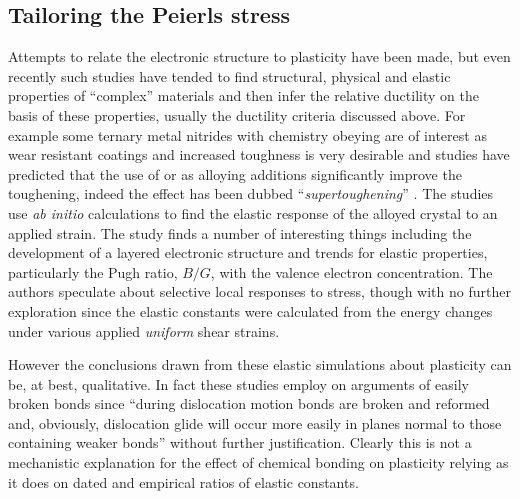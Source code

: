 



\FloatBarrier
\subsection{Tailoring the Peierls stress}
\label{subsec:tailor_peierls}
\FloatBarrier


Attempts to relate the electronic structure to plasticity have been made, but even recently such studies have tended to find structural, physical and elastic properties of ``complex'' materials and then infer the relative ductility on the basis of these properties, usually the ductility criteria discussed above. For example some ternary metal nitrides with chemistry obeying  are of interest as wear resistant coatings and increased toughness is very desirable and studies have predicted that the use of  or  as alloying additions significantly improve the toughening, indeed the effect has been dubbed ``\emph{supertoughening}'' \cite{Sangiovanni2010,Sangiovanni2011}. The studies use \emph{ab initio} calculations to find the elastic response of the alloyed crystal to an applied strain. The study finds a number of interesting things including the development of a layered electronic structure and trends for elastic properties, particularly the Pugh ratio, $B/G$, with the valence electron concentration. The authors speculate about selective local responses to stress, though with no further exploration since the elastic constants were calculated from the energy changes under various applied \emph{uniform} shear strains.

However the conclusions drawn from these elastic simulations about plasticity can be, at best, qualitative. In fact these studies employ on arguments of easily broken bonds since ``during dislocation motion bonds are broken and reformed and, obviously, dislocation glide will occur more easily in planes normal to those containing weaker bonds'' \cite{Sangiovanni2011} without further justification. Clearly this is not a mechanistic explanation for the effect of chemical bonding on plasticity relying as it does on dated and empirical ratios of elastic constants.


